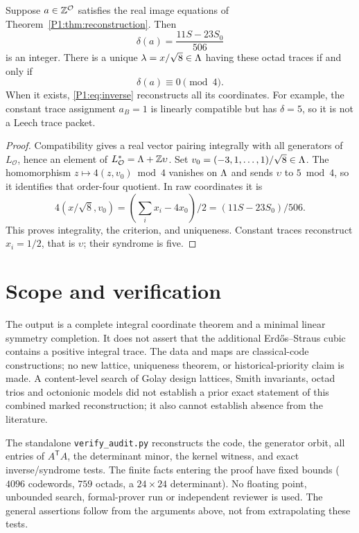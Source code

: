 \begin{theorem}\label{P1:thm:syndrome}
Suppose $a\in\mathbb Z^{\mathcal O}$ satisfies the real image equations of Theorem~\ref{P1:thm:reconstruction}. Then
\[
\delta(a)=\frac{11S-23S_0}{506}
\]
is an integer. There is a unique $\lambda=x/\sqrt8\in\Lambda$ having these octad traces if and only if
\begin{equation}\label{P1:eq:syndrome}
\boxed{\delta(a)\equiv0\pmod4.}
\end{equation}
When it exists, \eqref{P1:eq:inverse} reconstructs all its coordinates. For example, the constant trace assignment $a_B=1$ is linearly compatible but has $\delta=5$, so it is not a Leech trace packet.
\end{theorem}
\begin{proof}
Compatibility gives a real vector pairing integrally with all generators of $L_{\mathcal O}$, hence an element of $L_{\mathcal O}^*=\Lambda+\mathbb Z\upsilon$. Set $v_0=(-3,1,\ldots,1)/\sqrt8\in\Lambda$. The homomorphism $z\mapsto4(z,v_0)\bmod4$ vanishes on $\Lambda$ and sends $\upsilon$ to $5\bmod4$, so it identifies that order-four quotient. In raw coordinates it is
\[
4(x/\sqrt8,v_0)=(\sum_i x_i-4x_0)/2
=(11S-23S_0)/506.
\]
This proves integrality, the criterion, and uniqueness. Constant traces reconstruct $x_i=1/2$, that is $\upsilon$; their syndrome is five.
\end{proof}

\section{Scope and verification}
The output is a complete integral coordinate theorem and a minimal linear symmetry completion. It does not assert that the additional Erd\H{o}s--Straus cubic contains a positive integral trace. The data and maps are classical-code constructions; no new lattice, uniqueness theorem, or historical-priority claim is made. A content-level search of Golay design lattices, Smith invariants, octad trios and octonionic models did not establish a prior exact statement of this combined marked reconstruction; it also cannot establish absence from the literature.

The standalone \texttt{verify\_audit.py} reconstructs the code, the generator orbit, all entries of $A^{\mathsf T}A$, the determinant minor, the kernel witness, and exact inverse/syndrome tests. The finite facts entering the proof have fixed bounds ($4096$ codewords, $759$ octads, a $24\times24$ determinant). No floating point, unbounded search, formal-prover run or independent reviewer is used. The general assertions follow from the arguments above, not from extrapolating these tests.

